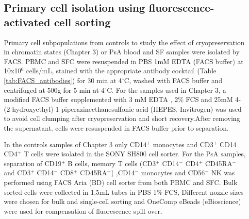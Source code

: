 \subsection{Primary cell isolation using fluorescence-activated cell sorting}
Primary cell subpopulations from controls to study the effect of cryopreservation in chromatin states (Chapter 3) or PsA blood and SF samples were isolated by FACS. PBMC and SFC were resuspended in PBS 1mM EDTA (FACS buffer) at 10x10$^6$ cells/mL, stained with the appropriate antibody cocktail (Table \ref{tab:FACS_antibodies}) for 30 min at 4{$^\circ$}C, washed with FACS buffer and centrifuged at 500g for 5 min at 4{$^\circ$}C. For the samples used in Chapter 3, a modified FACS buffer supplemented with 3 mM EDTA , 2\% FCS and 25mM 4-(2-hydroxyethyl)-1-piperazineethanesulfonic acid (HEPES, Invitrogen) was used to avoid cell clumping after cryopreservation and short recovery.After removing the supernatant, cells were resuspended in FACS buffer prior to separation. 

In the controls samples of Chapter 3 only CD14$^{+}$ monocytes and CD3$^+$ CD14$^{-}$ CD4$^{+}$ T cells were isolated in the SONY SH800 cell sorter. For the PsA samples, separation of  CD19$^{+}$ B cells, memory T cells (CD3$^{+}$ CD14$^{-}$ CD4$^{+}$ CD45RA$^{-}$ and CD3$^{+}$ CD14$^{-}$ CD8$^{+}$ CD45RA$^{-}$) ,CD14$^{-}$ monocytes and CD56$^{-}$ NK was performed using FACS Aria (BD) cell sorter from both PBMC and SFC. Bulk sorted cells were collected in 1.5mL tubes in PBS 1\% FCS, %
Different nozzle sizes were chosen for bulk and single-cell sorting and OneComp eBeads (eBioscience) were used for compensation of fluorescence spill over.



